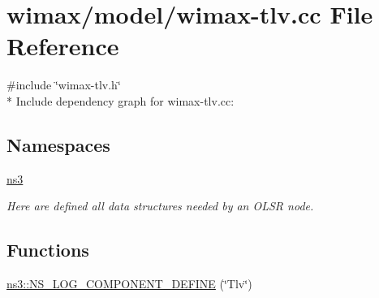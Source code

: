 \hypertarget{wimax-tlv_8cc}{}\section{wimax/model/wimax-\/tlv.cc File Reference}
\label{wimax-tlv_8cc}
{\ttfamily \#include \char`\"{}wimax-\/tlv.\+h\char`\"{}}\\*
Include dependency graph for wimax-\/tlv.cc\+:
\subsection*{Namespaces}
\begin{DoxyCompactItemize}
\item 
 \hyperlink{namespacens3}{ns3}
\begin{DoxyCompactList}\small\item\em Here are defined all data structures needed by an O\+L\+SR node. \end{DoxyCompactList}\end{DoxyCompactItemize}
\subsection*{Functions}
\begin{DoxyCompactItemize}
\item 
\hyperlink{namespacens3_a107b0f1009d035e8ceb5c130fdaaba10}{ns3\+::\+N\+S\+\_\+\+L\+O\+G\+\_\+\+C\+O\+M\+P\+O\+N\+E\+N\+T\+\_\+\+D\+E\+F\+I\+NE} (\char`\"{}Tlv\char`\"{})
\end{DoxyCompactItemize}
